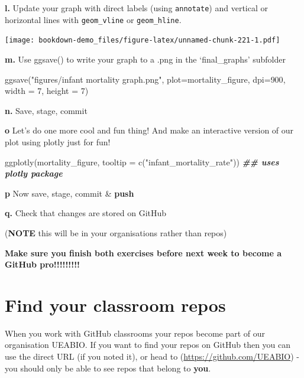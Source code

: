\documentclass[
]{book}
\newenvironment{Shaded}{\begin{snugshade}}{\end{snugshade}}
\newcommand{\AttributeTok}[1]{\textcolor[rgb]{0.77,0.63,0.00}{#1}}
\newcommand{\DecValTok}[1]{\textcolor[rgb]{0.00,0.00,0.81}{#1}}
\newcommand{\DocumentationTok}[1]{\textcolor[rgb]{0.56,0.35,0.01}{\textbf{\textit{#1}}}}
\newcommand{\FunctionTok}[1]{\textcolor[rgb]{0.00,0.00,0.00}{#1}}
\newcommand{\NormalTok}[1]{#1}
\newcommand{\StringTok}[1]{\textcolor[rgb]{0.31,0.60,0.02}{#1}}
\begin{document}
\textbf{l.} Update your graph with direct labels (using \texttt{annotate}) and vertical or horizontal lines with \texttt{geom\_vline} or \texttt{geom\_hline}.

\texttt{[image: bookdown-demo\_files/figure-latex/unnamed-chunk-221-1.pdf]}

\textbf{m.} Use ggsave() to write your graph to a .png in the `final\_graphs' subfolder

\begin{Shaded}
\begin{Highlighting}[]
\FunctionTok{ggsave}\NormalTok{(}\StringTok{"figures/infant mortality graph.png"}\NormalTok{, }\AttributeTok{plot=}\NormalTok{mortality\_figure, }\AttributeTok{dpi=}\DecValTok{900}\NormalTok{, }\AttributeTok{width =} \DecValTok{7}\NormalTok{, }\AttributeTok{height =} \DecValTok{7}\NormalTok{)}
\end{Highlighting}
\end{Shaded}

\textbf{n.} Save, stage, commit

\textbf{o} Let's do one more cool and fun thing! And make an interactive version of our plot using plotly \citet{R-plotly} just for fun!

\begin{Shaded}
\begin{Highlighting}[]
\FunctionTok{ggplotly}\NormalTok{(mortality\_figure, }\AttributeTok{tooltip =} \FunctionTok{c}\NormalTok{(}\StringTok{"infant\_mortality\_rate"}\NormalTok{))}
\DocumentationTok{\#\# uses plotly package}
\end{Highlighting}
\end{Shaded}

\textbf{p} Now save, stage, commit \& \textbf{push}

\textbf{q.} Check that changes are stored on GitHub

(\textbf{NOTE} this will be in your organisations rather than repos)

\textbf{Make sure you finish both exercises before next week to become a GitHub pro!!!!!!!!!}

\hypertarget{find-your-classroom-repos}{%
\section{Find your classroom repos}\label{find-your-classroom-repos}}

When you work with GitHub classrooms your repos become part of our organisation UEABIO.
If you want to find your repos on GitHub then you can use the direct URL (if you noted it), or head to (\url{https://github.com/UEABIO}) - you should only be able to see repos that belong to \textbf{you}.
\end{document}
